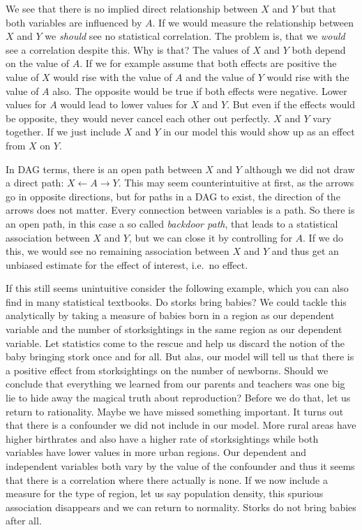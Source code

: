 \documentclass[
]{book}
\begin{document}
We see that there is no implied direct relationship between \(X\) and \(Y\) but that
both variables are influenced by \(A\). If we would measure the relationship
between \(X\) and \(Y\) we \emph{should} see no statistical correlation. The problem is,
that we \emph{would} see a correlation despite this. Why is that?
The values of \(X\) and \(Y\) both depend on the value of \(A\). If we for example
assume that both effects are positive the value of \(X\) would rise with the value
of \(A\) and the value of \(Y\) would rise with the value of \(A\) also.
The opposite would be true if both effects were negative. Lower values for \(A\)
would lead to lower values for \(X\) and \(Y\).
But even if the effects would be opposite, they would never cancel each other out
perfectly. \(X\) and \(Y\) vary together.
If we just include \(X\) and \(Y\) in our model this would show up as an
effect from \(X\) on \(Y\).

In DAG terms, there is an open path between \(X\) and \(Y\) although we did not
draw a direct path: \(X \leftarrow A \rightarrow Y\). This may seem
counterintuitive at first, as the arrows go in opposite directions, but for
paths in a DAG to exist, the direction of the arrows does not matter. Every
connection between variables is a path. So there is an open path, in this case
a so called \emph{backdoor path}, that leads to a statistical association between
\(X\) and \(Y\), but we can close it by controlling for \(A\). If we do this, we would
see no remaining association between \(X\) and \(Y\) and thus get an unbiased
estimate for the effect of interest, i.e.~no effect.

If this still seems unintuitive consider the following example, which you can
also find in many statistical textbooks. Do storks bring babies? We could tackle
this analytically by taking a measure of babies born in a region as our dependent
variable and the number of storksightings in the same region as our dependent
variable. Let statistics come to the rescue and help us discard the notion of
the baby bringing stork once and for all. But alas, our model will tell us that
there is a positive effect from storksightings on the number of newborns. Should
we conclude that everything we learned from our parents and teachers was one big
lie to hide away the magical truth about reproduction? Before we do that, let us
return to rationality. Maybe we have missed something important. It turns out
that there is a confounder we did not include in our model. More rural areas
have higher birthrates and also have a higher rate of storksightings while both
variables have lower values in more urban regions. Our dependent and independent
variables both vary by the value of the confounder and thus it seems that there
is a correlation where there actually is none. If we now include a measure for
the type of region, let us say population density, this spurious association
disappears and we can return to normality. Storks do not bring babies after all.
\end{document}
